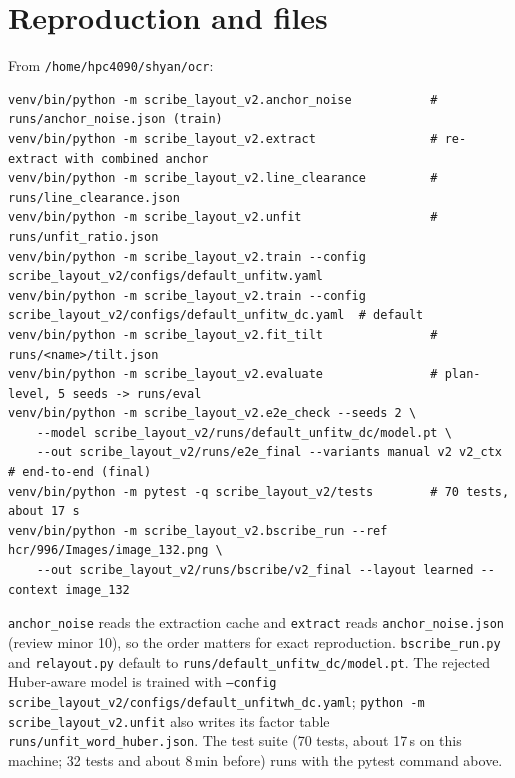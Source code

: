 \documentclass[11pt,a4paper]{article}
\begin{document}
\section{Reproduction and files}
From \texttt{/home/hpc4090/shyan/ocr}:
\begin{lstlisting}
venv/bin/python -m scribe_layout_v2.anchor_noise           # runs/anchor_noise.json (train)
venv/bin/python -m scribe_layout_v2.extract                # re-extract with combined anchor
venv/bin/python -m scribe_layout_v2.line_clearance         # runs/line_clearance.json
venv/bin/python -m scribe_layout_v2.unfit                  # runs/unfit_ratio.json
venv/bin/python -m scribe_layout_v2.train --config scribe_layout_v2/configs/default_unfitw.yaml
venv/bin/python -m scribe_layout_v2.train --config scribe_layout_v2/configs/default_unfitw_dc.yaml  # default
venv/bin/python -m scribe_layout_v2.fit_tilt               # runs/<name>/tilt.json
venv/bin/python -m scribe_layout_v2.evaluate               # plan-level, 5 seeds -> runs/eval
venv/bin/python -m scribe_layout_v2.e2e_check --seeds 2 \
    --model scribe_layout_v2/runs/default_unfitw_dc/model.pt \
    --out scribe_layout_v2/runs/e2e_final --variants manual v2 v2_ctx   # end-to-end (final)
venv/bin/python -m pytest -q scribe_layout_v2/tests        # 70 tests, about 17 s
venv/bin/python -m scribe_layout_v2.bscribe_run --ref hcr/996/Images/image_132.png \
    --out scribe_layout_v2/runs/bscribe/v2_final --layout learned --context image_132
\end{lstlisting}
\texttt{anchor\_noise} reads the extraction cache and \texttt{extract} reads
\texttt{anchor\_noise.json} (review minor 10), so the order matters for exact
reproduction. \texttt{bscribe\_run.py} and \texttt{relayout.py} default to
\texttt{runs/default\_unfitw\_dc/model.pt}. The rejected Huber-aware model
is trained with \texttt{--config scribe\_layout\_v2/configs/default\_unfitwh\_dc.yaml};
\texttt{python -m scribe\_layout\_v2.unfit} also writes its factor table
\texttt{runs/unfit\_word\_huber.json}. The test suite (70 tests, about
17\,s on this machine; 32 tests and about 8\,min before) runs with the
pytest command above.
\end{document}
